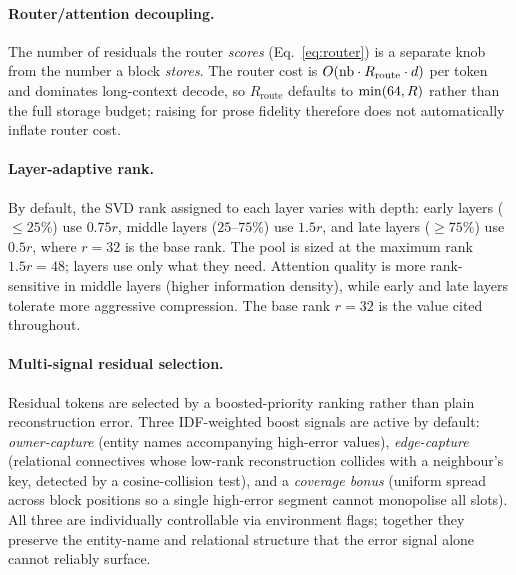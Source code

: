 \paragraph{Router/attention decoupling.} The number of residuals the router \emph{scores}
(Eq.~\eqref{eq:router}) is a separate knob from the number a block \emph{stores}. The router cost
is $O(\text{nb}\cdot R_{\text{route}}\cdot d)$ per token and dominates long-context decode, so
$R_{\text{route}}$ defaults to $\min(64, R{})$ rather than the full storage budget; raising
\maxres{} for prose fidelity therefore does not automatically inflate router cost.

\paragraph{Layer-adaptive rank.} By default, the SVD rank assigned to each layer varies with
depth: early layers ($\leq 25\%$) use $0.75r$, middle layers ($25$--$75\%$) use $1.5r$, and late
layers ($\geq 75\%$) use $0.5r$, where $r{=}32$ is the base rank. The pool is sized at the
maximum rank $1.5r{=}48$; layers use only what they need. Attention quality is more
rank-sensitive in middle layers (higher information density), while early and late layers tolerate
more aggressive compression. The base rank $r{=}32$ is the value cited throughout.

\paragraph{Multi-signal residual selection.} Residual tokens are selected by a boosted-priority
ranking rather than plain reconstruction error. Three IDF-weighted boost signals are active by
default: \emph{owner-capture} (entity names accompanying high-error values), \emph{edge-capture}
(relational connectives whose low-rank reconstruction collides with a neighbour's key, detected
by a cosine-collision test), and a \emph{coverage bonus} (uniform spread across block positions
so a single high-error segment cannot monopolise all slots). All three are individually
controllable via environment flags; together they preserve the entity-name and relational
structure that the error signal alone cannot reliably surface.

